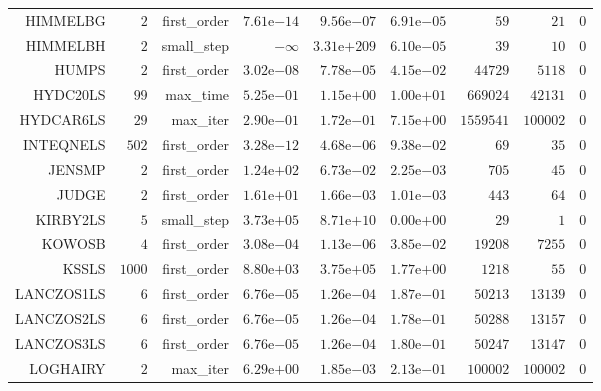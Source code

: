 \begin{longtable}{rrrrrrrrr}
HIMMELBG & \(     2\) & first\_order & \( 7.61\)e\(-14\) & \( 9.56\)e\(-07\) & \( 6.91\)e\(-05\) & \(    59\) & \(    21\) & \(     0\) \\
HIMMELBH & \(     2\) & small\_step & \(-\infty\) & \(3.31\)e\(+209\) & \( 6.10\)e\(-05\) & \(    39\) & \(    10\) & \(     0\) \\
HUMPS & \(     2\) & first\_order & \( 3.02\)e\(-08\) & \( 7.78\)e\(-05\) & \( 4.15\)e\(-02\) & \( 44729\) & \(  5118\) & \(     0\) \\
HYDC20LS & \(    99\) & max\_time & \( 5.25\)e\(-01\) & \( 1.15\)e\(+00\) & \( 1.00\)e\(+01\) & \(669024\) & \( 42131\) & \(     0\) \\
HYDCAR6LS & \(    29\) & max\_iter & \( 2.90\)e\(-01\) & \( 1.72\)e\(-01\) & \( 7.15\)e\(+00\) & \(1559541\) & \(100002\) & \(     0\) \\
INTEQNELS & \(   502\) & first\_order & \( 3.28\)e\(-12\) & \( 4.68\)e\(-06\) & \( 9.38\)e\(-02\) & \(    69\) & \(    35\) & \(     0\) \\
JENSMP & \(     2\) & first\_order & \( 1.24\)e\(+02\) & \( 6.73\)e\(-02\) & \( 2.25\)e\(-03\) & \(   705\) & \(    45\) & \(     0\) \\
JUDGE & \(     2\) & first\_order & \( 1.61\)e\(+01\) & \( 1.66\)e\(-03\) & \( 1.01\)e\(-03\) & \(   443\) & \(    64\) & \(     0\) \\
KIRBY2LS & \(     5\) & small\_step & \( 3.73\)e\(+05\) & \( 8.71\)e\(+10\) & \( 0.00\)e\(+00\) & \(    29\) & \(     1\) & \(     0\) \\
KOWOSB & \(     4\) & first\_order & \( 3.08\)e\(-04\) & \( 1.13\)e\(-06\) & \( 3.85\)e\(-02\) & \( 19208\) & \(  7255\) & \(     0\) \\
KSSLS & \(  1000\) & first\_order & \( 8.80\)e\(+03\) & \( 3.75\)e\(+05\) & \( 1.77\)e\(+00\) & \(  1218\) & \(    55\) & \(     0\) \\
LANCZOS1LS & \(     6\) & first\_order & \( 6.76\)e\(-05\) & \( 1.26\)e\(-04\) & \( 1.87\)e\(-01\) & \( 50213\) & \( 13139\) & \(     0\) \\
LANCZOS2LS & \(     6\) & first\_order & \( 6.76\)e\(-05\) & \( 1.26\)e\(-04\) & \( 1.78\)e\(-01\) & \( 50288\) & \( 13157\) & \(     0\) \\
LANCZOS3LS & \(     6\) & first\_order & \( 6.76\)e\(-05\) & \( 1.26\)e\(-04\) & \( 1.80\)e\(-01\) & \( 50247\) & \( 13147\) & \(     0\) \\
LOGHAIRY & \(     2\) & max\_iter & \( 6.29\)e\(+00\) & \( 1.85\)e\(-03\) & \( 2.13\)e\(-01\) & \(100002\) & \(100002\) & \(     0\) \\

\end{longtable}
